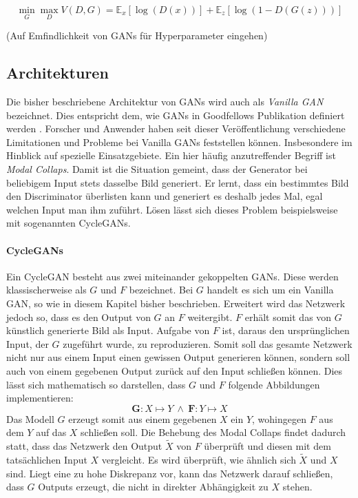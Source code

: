 \begin{equation}
	\min_{G} \max_{D} V(D,G) = \mathbb{E}_{x}[\log(D(x))] + \mathbb{E}_{z}[\log(1-D(G(z)))]
\end{equation}

(Auf Emfindlichkeit von GANs für Hyperparameter eingehen)

\subsection{Architekturen}
Die bisher beschriebene Architektur von \acp{GAN} wird auch als \emph{Vanilla \ac{GAN}} bezeichnet. Dies entspricht dem, wie \acp{GAN} in Goodfellows Publikation definiert werden \cite{Goodfellow-GANs}. Forscher und Anwender haben seit dieser Veröffentlichung verschiedene Limitationen und Probleme bei Vanilla \acp{GAN} feststellen können. Insbesondere im Hinblick auf spezielle Einsatzgebiete. Ein hier häufig anzutreffender Begriff ist \emph{Modal Collaps}. Damit ist die Situation gemeint, dass der Generator bei beliebigem Input stets dasselbe Bild generiert. Er lernt, dass ein bestimmtes Bild den Discriminator überlisten kann und generiert es deshalb jedes Mal, egal welchen Input man ihm zuführt. Lösen lässt sich dieses Problem beispielsweise mit sogenannten \acp{CycleGAN}.

\paragraph{CycleGANs}
Ein \ac{CycleGAN} besteht aus zwei miteinander gekoppelten \acp{GAN}. Diese werden klassischerweise als $G$ und $F$ bezeichnet. Bei $G$ handelt es sich um ein Vanilla \ac{GAN}, so wie in diesem Kapitel bisher beschrieben. Erweitert wird das Netzwerk jedoch so, dass es den Output von $G$ an $F$ weitergibt. $F$ erhält somit das von $G$ künstlich generierte Bild als Input. Aufgabe von $F$ ist, daraus den ursprünglichen Input, der $G$ zugeführt wurde, zu reproduzieren. Somit soll das gesamte Netzwerk nicht nur aus einem Input einen gewissen Output generieren können, sondern soll auch von einem gegebenen Output zurück auf den Input schließen können. Dies lässt sich mathematisch so darstellen, dass $G$ und $F$ folgende Abbildungen implementieren:
\begin{equation}
	\mathbf{G}: X\mapsto Y \: \wedge \: \mathbf{F}: Y\mapsto X
\end{equation}
Das Modell $G$ erzeugt somit aus einem gegebenen $X$ ein $Y$, wohingegen $F$ aus dem $Y$ auf das $X$ schließen soll. Die Behebung des Modal Collaps findet dadurch statt, dass das Netzwerk den Output $\tilde{X}$ von $F$ überprüft und diesen mit dem tatsächlichen Input $X$ vergleicht. Es wird überprüft, wie ähnlich sich $\tilde{X}$ und $X$ sind. Liegt eine zu hohe Diskrepanz vor, kann das Netzwerk darauf schließen, dass $G$ Outputs erzeugt, die nicht in direkter Abhängigkeit zu $X$ stehen. 

